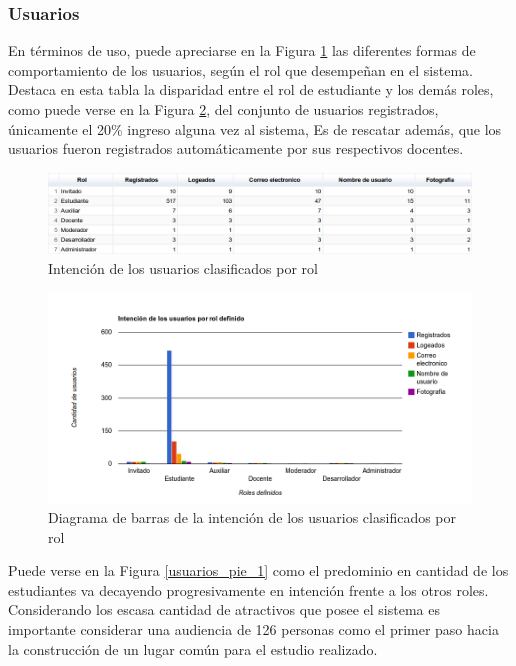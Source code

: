 \subsubsection{Usuarios}

En t\'erminos de uso, puede apreciarse en la Figura \ref{usuarios_tabla_1} las diferentes formas de comportamiento de los 
usuarios, seg\'un el rol que desempe\~nan en el sistema.
Destaca en esta tabla la disparidad entre el rol de estudiante y los dem\'as roles, como puede verse en la Figura 
\ref{usuarios_bars_1}, del conjunto de usuarios registrados, \'unicamente el 20\% ingreso alguna vez al sistema,
Es de rescatar adem\'as, que los usuarios fueron registrados autom\'aticamente por sus respectivos docentes.

\begin{figure}[H]
\centering
 \includegraphics[scale=0.4]{graphics/usuarios_tabla_1.png}
 \caption {Intenci\'on de los usuarios clasificados por rol}
 \label {usuarios_tabla_1}
\end{figure}

\begin{figure}[H]
\centering
 \includegraphics[scale=0.4]{graphics/usuarios_bars_1.png}
 \caption {Diagrama de barras de la intenci\'on de los usuarios clasificados por rol}
 \label {usuarios_bars_1}
\end{figure}

Puede verse en la Figura \ref{usuarios_pie_1} como el predominio en cantidad de los estudiantes va decayendo progresivamente
en intenci\'on frente a los otros roles. Considerando los escasa cantidad de atractivos que posee el sistema es importante 
considerar una audiencia de 126 personas como el primer paso hacia la construcci\'on de un lugar com\'un para el estudio 
realizado.\\

